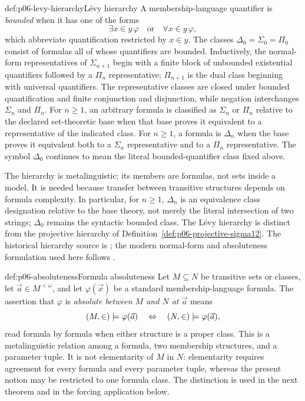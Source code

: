 \begin{hbdefinition}{def:p06-levy-hierarchy}{L\'evy hierarchy}
A membership-language quantifier is \emph{bounded} when it has one of the
forms
\[
  \exists x\in y\,\varphi
  \quad\text{or}\quad
  \forall x\in y\,\varphi,
\]
which abbreviate quantification restricted by \(x\in y\).  The classes
\(\Delta_0=\Sigma_0=\Pi_0\) consist of formulas all of whose quantifiers are
bounded.  Inductively, the normal-form representatives of
\(\Sigma_{n+1}\) begin with a finite block of unbounded existential
quantifiers followed by a \(\Pi_n\) representative; \(\Pi_{n+1}\) is the
dual class beginning with universal quantifiers.  The representative classes
are closed under bounded quantification and finite conjunction and
disjunction, while negation interchanges \(\Sigma_n\) and \(\Pi_n\).  For
\(n\geq1\), an arbitrary formula is classified as \(\Sigma_n\) or \(\Pi_n\)
relative to the declared set-theoretic base when that base proves it
equivalent to a representative of the indicated class.  For \(n\geq1\), a
formula is \(\Delta_n\) when the base proves it equivalent both to a \(\Sigma_n\)
representative and to a \(\Pi_n\) representative.  The symbol \(\Delta_0\)
continues to mean the literal bounded-quantifier class fixed above.

The hierarchy is metalinguistic: its members are formulas, not sets inside a
model.  It is needed because transfer between transitive structures depends
on formula complexity.  In particular, for \(n\geq1\), \(\Delta_n\) is an
equivalence class designation relative to the base theory, not merely the
literal intersection of two strings; \(\Delta_0\) remains the syntactic
bounded class.  The L\'evy hierarchy is distinct from the projective
hierarchy of Definition~\ref{def:p06-projective-sigma12}.
The historical hierarchy source is \cite{Levy1965}; the modern
normal-form and absoluteness formulation used here follows \cite{Jech2003}.
\end{hbdefinition}

\begin{hbconvention}{def:p06-absoluteness}{Formula absoluteness}
Let \(M\subseteq N\) be transitive sets or classes, let
\(\vec a\in M^{<\omega}\), and let \(\varphi(\vec x)\) be a standard
membership-language formula.  The assertion that \(\varphi\) is
\emph{absolute between \(M\) and \(N\) at \(\vec a\)} means
\[
  (M,\in)\models\varphi(\vec a)
  \quad\Leftrightarrow\quad
  (N,\in)\models\varphi(\vec a),
\]
read formula by formula when either structure is a proper class.  This is a
metalinguistic relation among a formula, two membership structures, and a
parameter tuple.  It is not elementarity of \(M\) in \(N\): elementarity
requires agreement for every formula and every parameter tuple, whereas the
present notion may be restricted to one formula class.  The distinction is
used in the next theorem and in the forcing application below.
\end{hbconvention}

